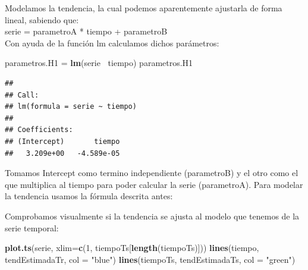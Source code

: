 \documentclass[]{article}
\newenvironment{Shaded}{\begin{snugshade}}{\end{snugshade}}
\newcommand{\KeywordTok}[1]{\textcolor[rgb]{0.13,0.29,0.53}{\textbf{#1}}}
\newcommand{\DataTypeTok}[1]{\textcolor[rgb]{0.13,0.29,0.53}{#1}}
\newcommand{\DecValTok}[1]{\textcolor[rgb]{0.00,0.00,0.81}{#1}}
\newcommand{\StringTok}[1]{\textcolor[rgb]{0.31,0.60,0.02}{#1}}
\newcommand{\CommentTok}[1]{\textcolor[rgb]{0.56,0.35,0.01}{\textit{#1}}}
\newcommand{\OperatorTok}[1]{\textcolor[rgb]{0.81,0.36,0.00}{\textbf{#1}}}
\newcommand{\NormalTok}[1]{#1}
\begin{document}
Modelamos la tendencia, la cual podemos aparentemente ajustarla de forma
lineal, sabiendo que:\\
serie = parametroA * tiempo + parametroB\\
Con ayuda de la función lm calculamos dichos parámetros:

\begin{Shaded}
\begin{Highlighting}[]
\NormalTok{parametros.H1 =}\StringTok{ }\KeywordTok{lm}\NormalTok{(serie }\OperatorTok{~}\NormalTok{tiempo) }
\NormalTok{parametros.H1}
\end{Highlighting}
\end{Shaded}

\begin{verbatim}
## 
## Call:
## lm(formula = serie ~ tiempo)
## 
## Coefficients:
## (Intercept)       tiempo  
##   3.209e+00   -4.589e-05
\end{verbatim}

Tomamos Intercept como termino independiente (parametroB) y el otro como
el que multiplica al tiempo para poder calcular la serie (parametroA).
Para modelar la tendencia usamos la fórmula descrita antes:

\begin{Shaded}
\end{Shaded}

Comprobamos visualmente si la tendencia se ajusta al modelo que tenemos
de la serie temporal:

\begin{Shaded}
\begin{Highlighting}[]
\KeywordTok{plot.ts}\NormalTok{(serie, }\DataTypeTok{xlim=}\KeywordTok{c}\NormalTok{(}\DecValTok{1}\NormalTok{, tiempoTs[}\KeywordTok{length}\NormalTok{(tiempoTs)])) }
\KeywordTok{lines}\NormalTok{(tiempo, tendEstimadaTr, }\DataTypeTok{col =} \StringTok{"blue"}\NormalTok{) }
\KeywordTok{lines}\NormalTok{(tiempoTs, tendEstimadaTs, }\DataTypeTok{col =} \StringTok{"green"}\NormalTok{)}
\end{Highlighting}
\end{Shaded}
\end{document}
